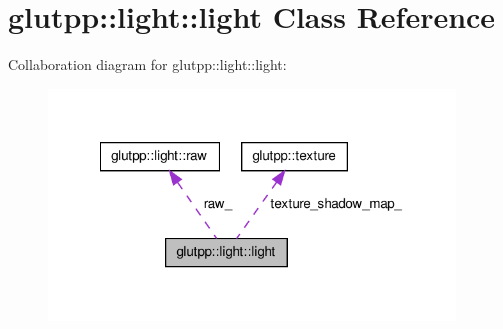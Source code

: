 \hypertarget{classglutpp_1_1light_1_1light}{\section{glutpp\-:\-:light\-:\-:light \-Class \-Reference}
\label{classglutpp_1_1light_1_1light}
}


\-Collaboration diagram for glutpp\-:\-:light\-:\-:light\-:\nopagebreak
\begin{figure}[H]
\begin{center}
\leavevmode
\includegraphics[width=306pt]{classglutpp_1_1light_1_1light__coll__graph}
\end{center}
\end{figure}
